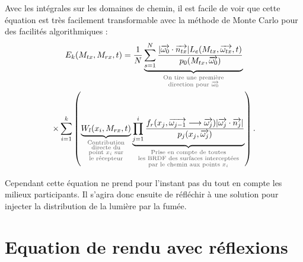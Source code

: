 Avec les intégrales sur les domaines de chemin, il est facile de voir que cette équation est très facilement transformable avec la méthode de Monte Carlo pour des facilités algorithmiques :
\large \begin{multline}
    E_k(M_{tx}, M_{rx}, t) =
    \frac{1}{N}
    \underbrace{
        \sum\limits_{s=1}^N \frac
            {| \overrightarrow{\omega_0} \cdot \overrightarrow{n_{tx}} |
             L_e(M_{tx}, \overrightarrow{\omega_{tx}}, t)}
            {p_0(M_{tx}, \overrightarrow{\omega_0})}
        }
        _{\textcolor{DarkGray}
         {\substack{\text{On tire une première} \\
                    \text{direction pour $\overrightarrow{\omega_0}$}}}}
    \\ \times
    \sum \limits_{i=1}^k
    \left(
        \underbrace
            {W_l(x_i, M_{rx}, t)}
            _{\textcolor{DarkGray}
             {\substack{\text{Contribution} \\
                        \text{directe du} \\
                        \text{point $x_i$ sur} \\
                        \text{le récepteur}}}}
        \underbrace
            {\prod\limits_{j=1}^i
                \frac
                    {f_r(x_j, \overrightarrow{\omega_{j-1}} \longrightarrow \overrightarrow{\omega_{j}})
                    | \overrightarrow{\omega_j} \cdot \overrightarrow{n_j} |}
                    {p_j(x_j, \overrightarrow{\omega_{j}})}}
                _{\textcolor{DarkGray}
                 {\substack{\text{Prise en compte de toutes} \\
                            \text{les BRDF des surfaces interceptées} \\
                            \text{par le chemin aux points $x_i$}}}}
    \right)
.\end{multline} \normalsize \newline\par
Cependant cette équation ne prend pour l'instant pas du tout en compte les milieux participants. Il s'agira donc ensuite de réfléchir à une solution pour injecter la distribution de la lumière par la fumée.

\section{Equation de rendu avec réflexions}

